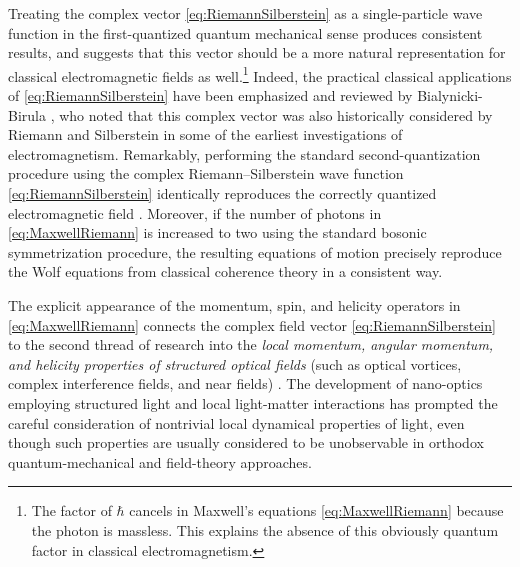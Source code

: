 \documentclass[1p,sort&compress]{elsarticle}
\numberwithin{equation}{section}
\begin{document}
Treating the complex vector \eqref{eq:RiemannSilberstein} as a single-particle wave function in the first-quantized quantum mechanical sense produces consistent results, and suggests that this vector should be a more natural representation for classical electromagnetic fields as well.\footnote{The factor of $\hbar$ cancels in Maxwell's equations \eqref{eq:MaxwellRiemann} because the photon is massless. This explains the absence of this obviously quantum factor in classical electromagnetism.} Indeed, the practical classical applications of \eqref{eq:RiemannSilberstein} have been emphasized and reviewed by Bialynicki-Birula \cite{Bialynicki-Birula1996,Bialynicki-Birula2013}, who noted that this complex vector was also historically considered by Riemann \cite{Weber1901} and Silberstein \cite{Silberstein1907a,Silberstein1907b} in some of the earliest investigations of electromagnetism.  Remarkably, performing the standard second-quantization procedure using the complex Riemann--Silberstein wave function \eqref{eq:RiemannSilberstein} identically reproduces the correctly quantized electromagnetic field \cite{Smith2007,Tamburini2008}.  Moreover, if the number of photons in \eqref{eq:MaxwellRiemann} is increased to two using the standard bosonic symmetrization procedure, the resulting equations of motion precisely reproduce the Wolf equations from classical coherence theory \cite{Saleh2005,Smith2007} in a consistent way.  

The explicit appearance of the momentum, spin, and helicity operators in \eqref{eq:MaxwellRiemann} connects the complex field vector \eqref{eq:RiemannSilberstein} to the second thread of research into the \emph{local momentum, angular momentum, and helicity properties of structured optical fields} (such as optical vortices, complex interference fields, and near fields) \cite{Nye1974,Allen1992,Enk1994,Allen1999,Andrews2008,Torres2011,Andrews2013,O'Neil2002,Garces2003,Curtis2003,
Zhao2007,Adachi2007,Roy2014,Bliokh2014,Arlt2003,Leach2006,Yeganeh2013,Terborg2013,Dennis2008,
Berry2009,Bekshaev2011,Kocsis2011,Dennis2013,Bliokh2013,Bliokh2013a,Barnett2013,
Huard1978,Huard1979,Bliokh2012,Bliokh2013b,Bekshaev2014,
Tang2010,Hendry2010,Bliokh2011,Tang2011,Hendry2012,Schaferling2012,Canaguier2013,Cameron2012c,Tkachenko2014,Bliokh2013c}.  
The development of nano-optics employing structured light and local light-matter interactions has prompted the careful consideration of nontrivial local dynamical properties of light, even though such properties are usually considered to be unobservable in orthodox quantum-mechanical and field-theory approaches. 
\end{document}
